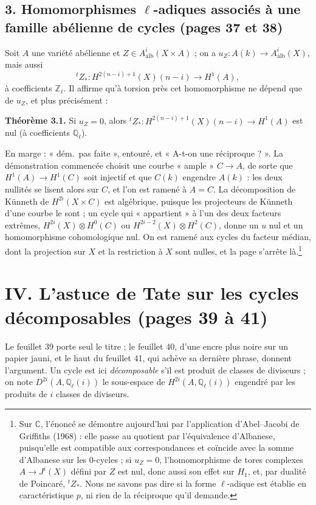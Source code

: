 \documentclass[11pt,a4paper]{article}
\begin{document}
\subsection*{3. Homomorphismes $\ell$-adiques associés à une famille abélienne
de cycles (pages 37 et 38)}

Soit $A$ une variété abélienne et $Z \in A^{i}_{\mathrm{alb}}(X \times A)$ ; on
a $u_{Z} \colon A(k) \to A^{i}_{\mathrm{alb}}(X)$, mais aussi
\[
{}^{t}Z_{*} \colon H^{2(n-i)+1}(X)(n-i) \longrightarrow H^{1}(A) ,
\]
à coefficients $\mathbb{Z}_{\ell}$. Il affirme qu'à torsion près cet
homomorphisme ne dépend que de $u_{Z}$, et plus précisément :

\textbf{Théorème 3.1.} Si $u_{Z} = 0$, alors ${}^{t}Z_{*} \colon
H^{2(n-i)+1}(X)(n-i) \to H^{1}(A)$ est nul (à coefficients $\mathbb{Q}_{\ell}$).

En marge : « dém.\ pas faite », entouré, et « A-t-on une réciproque ? ». La
démonstration commencée choisit une courbe « ample » $C \to A$, de sorte que
$H^{1}(A) \to H^{1}(C)$ soit injectif et que $C(k)$ engendre $A(k)$ : les deux
nullités se lisent alors sur $C$, et l'on est ramené à $A = C$. La décomposition
de Künneth de $H^{2i}(X \times C)$ est algébrique, puisque les projecteurs de
Künneth d'une courbe le sont ; un cycle qui « appartient » à l'un des deux
facteurs extrêmes, $H^{2i}(X) \otimes H^{0}(C)$ ou $H^{2i-2}(X) \otimes
H^{2}(C)$, donne un $u$ nul et un homomorphisme cohomologique nul. On est
ramené aux cycles du facteur médian, dont la projection sur $X$ et la
restriction à $X$ sont nulles, et la page s'arrête là.\footnote{Sur
$\mathbb{C}$, l'énoncé se démontre aujourd'hui par l'application
d'Abel--Jacobi de Griffiths (1968) : elle passe au quotient par l'équivalence
d'Albanese, puisqu'elle est compatible aux correspondances et coïncide avec la
somme d'Albanese sur les $0$-cycles ; si $u_{Z} = 0$, l'homomorphisme de tores
complexes $A \to J^{i}(X)$ défini par $Z$ est nul, donc aussi son effet sur
$H_{1}$, et, par dualité de Poincaré, ${}^{t}Z_{*}$. Nous ne savons pas dire si
la forme $\ell$-adique est établie en caractéristique $p$, ni rien de la
réciproque qu'il demande.}

\section*{IV. L'astuce de Tate sur les cycles décomposables (pages 39 à 41)}

Le feuillet 39 porte seul le titre ; le feuillet 40, d'une encre plus noire sur
un papier jauni, et le haut du feuillet 41, qui achève sa dernière phrase,
donnent l'argument. Un cycle est ici \emph{décomposable} s'il est produit de
classes de diviseurs ; on note $D^{2i}(A, \mathbb{Q}_{\ell}(i))$ le sous-espace
de $H^{2i}(A, \mathbb{Q}_{\ell}(i))$ engendré par les produits de $i$ classes de
diviseurs.
\end{document}
